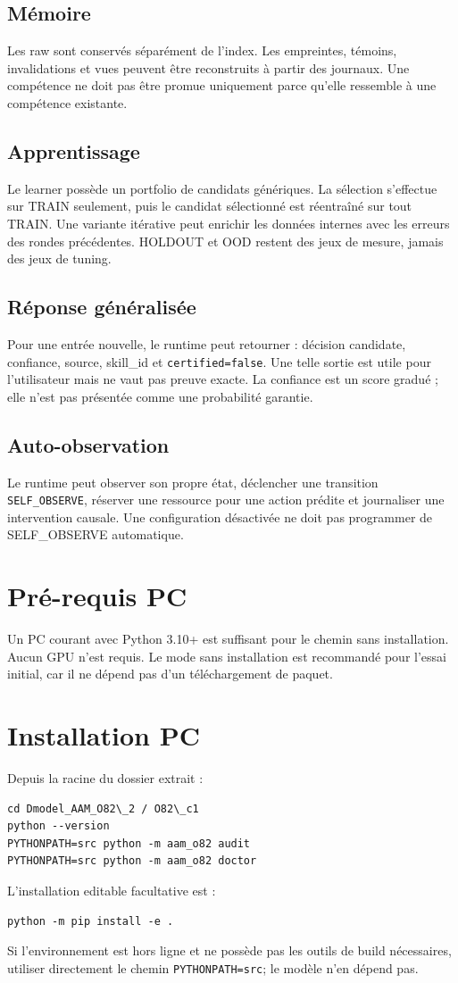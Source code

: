\documentclass[11pt,a4paper]{report}
\begin{document}
\section{Mémoire}
Les raw sont conservés séparément de l'index. Les empreintes, témoins, invalidations et vues peuvent être reconstruits à partir des journaux. Une compétence ne doit pas être promue uniquement parce qu'elle ressemble à une compétence existante.

\section{Apprentissage}
Le learner possède un portfolio de candidats génériques. La sélection s'effectue sur TRAIN seulement, puis le candidat sélectionné est réentraîné sur tout TRAIN. Une variante itérative peut enrichir les données internes avec les erreurs des rondes précédentes. HOLDOUT et OOD restent des jeux de mesure, jamais des jeux de tuning.

\section{Réponse généralisée}
Pour une entrée nouvelle, le runtime peut retourner : décision candidate, confiance, source, skill\_id et \texttt{certified=false}. Une telle sortie est utile pour l'utilisateur mais ne vaut pas preuve exacte. La confiance est un score gradué ; elle n'est pas présentée comme une probabilité garantie.

\section{Auto-observation}
Le runtime peut observer son propre état, déclencher une transition \texttt{SELF\_OBSERVE}, réserver une ressource pour une action prédite et journaliser une intervention causale. Une configuration désactivée ne doit pas programmer de SELF\_OBSERVE automatique.

\chapter{Pré-requis PC}
Un PC courant avec Python 3.10+ est suffisant pour le chemin sans installation. Aucun GPU n'est requis. Le mode sans installation est recommandé pour l'essai initial, car il ne dépend pas d'un téléchargement de paquet.

\chapter{Installation PC}
Depuis la racine du dossier extrait :
\begin{verbatim}
cd Dmodel_AAM_O82\_2 / O82\_c1
python --version
PYTHONPATH=src python -m aam_o82 audit
PYTHONPATH=src python -m aam_o82 doctor
\end{verbatim}
L'installation editable facultative est :
\begin{verbatim}
python -m pip install -e .
\end{verbatim}
Si l'environnement est hors ligne et ne possède pas les outils de build nécessaires, utiliser directement le chemin \texttt{PYTHONPATH=src}; le modèle n'en dépend pas.
\end{document}
